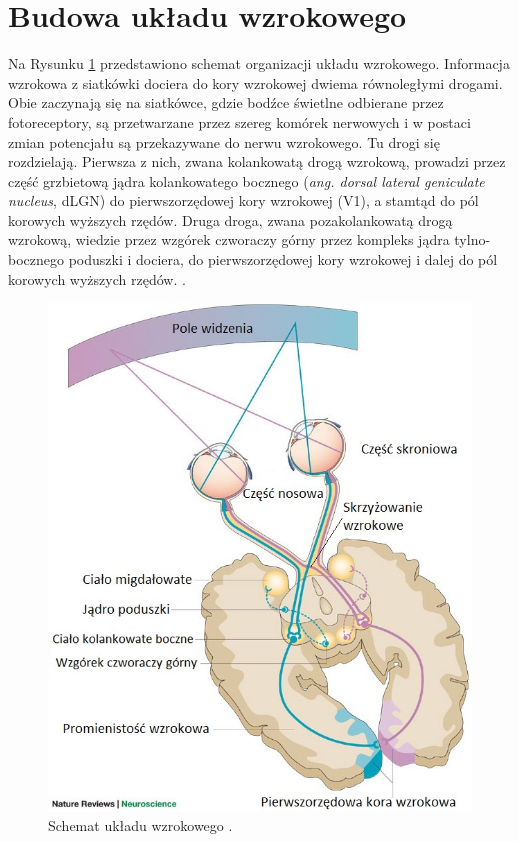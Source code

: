 \documentclass{pracamgr_2}
\begin{document}
	\section{Budowa układu wzrokowego}
	Na Rysunku \ref{rys:sch_u_wz} przedstawiono schemat organizacji układu wzrokowego. Informacja wzrokowa z siatkówki dociera do kory wzrokowej dwiema równoległymi drogami. Obie zaczynają się na siatkówce, gdzie bodźce świetlne odbierane przez fotoreceptory, są przetwarzane przez szereg komórek nerwowych i w postaci zmian potencjału są przekazywane do nerwu wzrokowego. Tu drogi się rozdzielają. Pierwsza z nich, zwana kolankowatą drogą wzrokową, prowadzi przez część grzbietową jądra kolankowatego bocznego (\textit{ang. dorsal lateral geniculate nucleus}, dLGN)  do pierwszorzędowej kory wzrokowej (V1), a stamtąd do pól korowych wyższych rzędów. Druga droga, zwana pozakolankowatą drogą wzrokową, wiedzie przez wzgórek czworaczy górny przez kompleks jądra tylno-bocznego poduszki i dociera, do pierwszorzędowej kory wzrokowej i dalej do pól korowych wyższych rzędów. \citep{viola}. 
	\begin{figure}[htbp]
		\begin{center}
			\includegraphics[scale=0.5]{schemat_ukladu.jpg}
		\end{center}
		\caption{Schemat układu wzrokowego \citep{hannula}.}
		\label{rys:sch_u_wz}
	\end{figure}
\end{document}
